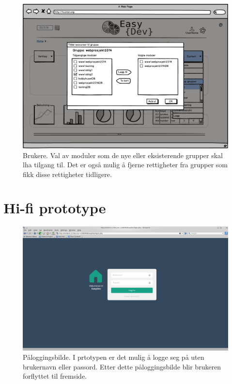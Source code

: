 \begin{figure}[ht]
\centering
\includegraphics[width=\lowB\textwidth,height=\textheight,keepaspectratio]{./img/prosessdokumentasjon/lowfi/b4.png}
\caption[Low-fi Brukere 4]{Brukere. Val av moduler som de nye eller eksisterende grupper skal lha tilgang til. Det er også mulig å fjerne rettigheter fra grupper som fikk disse rettigheter tidligere.}
\label{fig:brukerelow4}
\end{figure}


\section{Hi-fi prototype}
\begin{figure}[ht]
\includegraphics[width=\textwidth,height=\textheight,keepaspectratio]{./img/prosessdokumentasjon/hifi/login.png}
\caption[Hi-fi Påloggingsbilde]{Påloggingsbilde. I prtotypen er det mulig å logge seg på uten brukernavn eller passord. Etter dette påloggingsbilde blir brukeren forflyttet til fremside.}
\label{fig:loginhi}
\end{figure}

